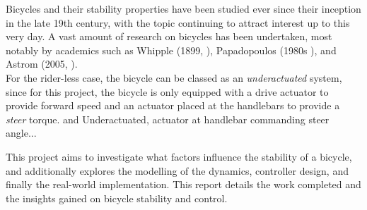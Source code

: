 Bicycles and their stability properties have been studied ever since their inception in the late 19th century, with the topic continuing to attract interest up to this very day. A vast amount of research on bicycles has been undertaken, most notably by academics such as Whipple (1899, \cite{whipple}), Papadopoulos (1980s \cite{papadopoulos}), and Astrom (2005, \cite{astrom}). \\

For the rider-less case, the bicycle can be classed as an \textit{underactuated} system, since for this project, the bicycle is only equipped with a drive actuator to provide forward speed and an actuator placed at the handlebars to provide a \textit{steer} torque. and Underactuated, actuator at handlebar commanding steer angle...

This project aims to investigate what factors influence the stability of a bicycle, and additionally explores the modelling of the dynamics, controller design, and finally the real-world implementation. This report details the work completed and the insights gained on bicycle stability and control.